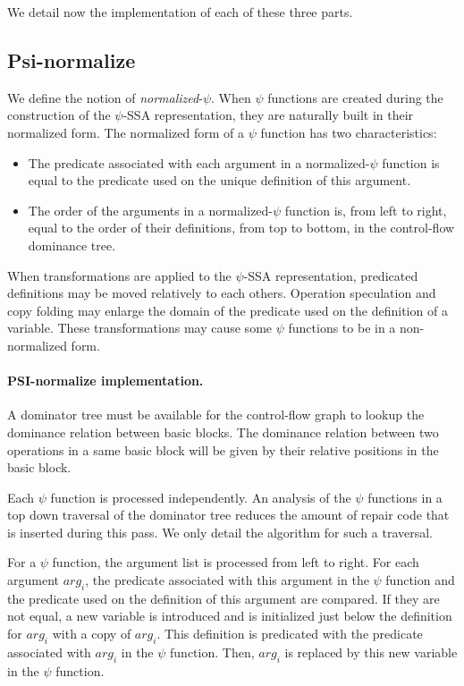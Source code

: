 We detail now the implementation of each of these three parts.

\subsection{Psi-normalize}

We define the notion of {\em normalized}-$\psi$. When $\psi$
functions are created during the construction of the $\psi$-SSA
representation, they are naturally built in their normalized form. The
normalized form of a $\psi$ function has two characteristics:

\begin{itemize}
\item The predicate associated with each argument in a
normalized-$\psi$ function is equal to the predicate used on the
unique definition of this argument.
\item The order of the arguments in a normalized-$\psi$ function is,
from left to right, equal to the order of their definitions, from top
to bottom, in the control-flow dominance tree.
\end{itemize}

When transformations are applied to the $\psi$-SSA representation,
predicated definitions may be moved relatively to each others.
Operation speculation and copy folding may enlarge the domain of the
predicate used on the definition of a variable. These transformations
may cause some $\psi$ functions to be in a non-normalized form.

\paragraph{PSI-normalize implementation.}
A dominator tree must be available for the control-flow graph to
lookup the dominance relation between basic blocks. The dominance
relation between two operations in a same basic block will be given by
their relative positions in the basic block.

Each $\psi$ function is processed independently. An analysis of the
$\psi$ functions in a top down traversal of the dominator tree
reduces the amount of repair code that is inserted during this pass. We
only detail the algorithm for such a traversal.

For a $\psi$ function, the argument list is processed from left to
right. For each argument $arg_i$, the predicate associated with this
argument in the $\psi$ function and the predicate used on the
definition of this argument are compared. If they are not equal, a new
variable is introduced and is initialized just below the definition
for $arg_i$ with a copy of $arg_i$. This definition is predicated with
the predicate associated with $arg_i$ in the $\psi$ function. Then,
$arg_i$ is replaced by this new variable in the $\psi$
function.

